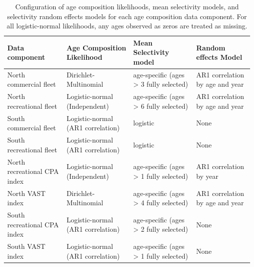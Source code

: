 \documentclass[
]{article}
\begin{document}
\setcounter{table}{0}
\renewcommand\thetable{S\arabic{table}}

\begin{landscape}\begin{table}

\caption{\label{tab:age-comp-sel-table}Configuration of age composition likelihoods, mean selectivity models, and selectivity random effects models for each age composition data component. For all logistic-normal likelihoods, any ages observed as zeros are treated as missing.}
\centering
\begin{tabular}[t]{llll}
\toprule
Data component & Age Composition Likelihood & Mean Selectivity model & Random effects Model\\
\midrule
North commercial fleet & Dirichlet-Multinomial & age-specific (ages > 3 fully selected) & AR1 correlation by age and year\\
North recreational fleet & Logistic-normal (Independent) & age-specific (ages > 6 fully selected) & AR1 correlation by age and year\\
South commercial fleet & Logistic-normal (AR1 correlation) & logistic & None\\
South recreational fleet & Logistic-normal (AR1 correlation) & logistic & None\\
North recreational CPA index & Logistic-normal (Independent) & age-specific (ages > 1 fully selected) & AR1 correlation by year\\
\addlinespace
North VAST index & Dirichlet-Multinomial & age-specific (ages > 4 fully selected) & AR1 correlation by age and year\\
South recreational CPA index & Logistic-normal (AR1 correlation) & age-specific (ages > 2 fully selected) & None\\
South VAST index & Logistic-normal (AR1 correlation) & age-specific (ages > 1 fully selected) & None\\
\bottomrule
\end{tabular}
\end{table}
\end{landscape}
\end{document}
